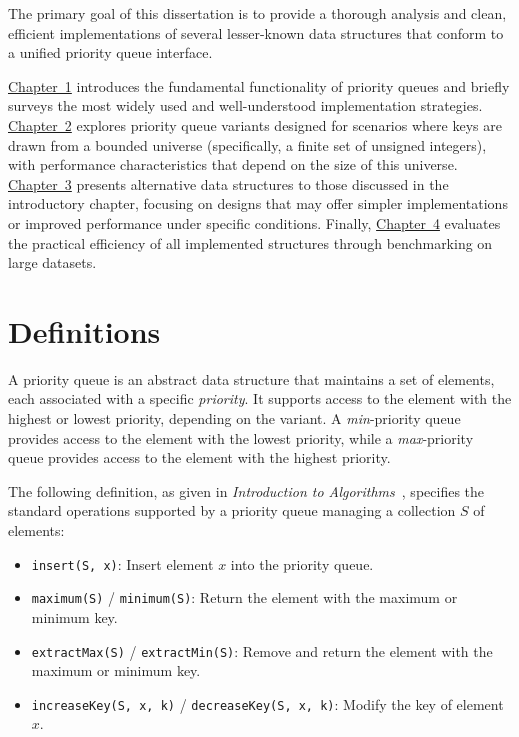 The primary goal of this dissertation is to provide a thorough analysis and clean, efficient implementations of several lesser-known data structures that conform to a unified priority queue interface.

\hyperref[chap:intro]{Chapter~1} introduces the fundamental functionality of priority queues and briefly surveys the most widely used and well-understood implementation strategies. \hyperref[chap:integer]{Chapter~2} explores priority queue variants designed for scenarios where keys are drawn from a bounded universe (specifically, a finite set of unsigned integers), with performance characteristics that depend on the size of this universe. \hyperref[chap:general]{Chapter~3} presents alternative data structures to those discussed in the introductory chapter, focusing on designs that may offer simpler implementations or improved performance under specific conditions. Finally, \hyperref[chap:benchmark]{Chapter~4} evaluates the practical efficiency of all implemented structures through benchmarking on large datasets.

\section{Definitions}

A priority queue is an abstract data structure that maintains a set of elements, each associated with a specific \emph{priority}. It supports access to the element with the highest or lowest priority, depending on the variant. A \emph{min}-priority queue provides access to the element with the lowest priority, while a \emph{max}-priority queue provides access to the element with the highest priority.

The following definition, as given in \emph{Introduction to Algorithms}~\cite{CLRS2022}, specifies the standard operations supported by a priority queue managing a collection \( S \) of elements:

\begin{itemize}
    \item \texttt{insert(S, x)}: Insert element \( x \) into the priority queue.
    \item \texttt{maximum(S)} / \texttt{minimum(S)}: Return the element with the maximum or minimum key.
    \item \texttt{extractMax(S)} / \texttt{extractMin(S)}: Remove and return the element with the maximum or minimum key.
    \item \texttt{increaseKey(S, x, k)} / \texttt{decreaseKey(S, x, k)}: Modify the key of element \( x \).
\end{itemize}

